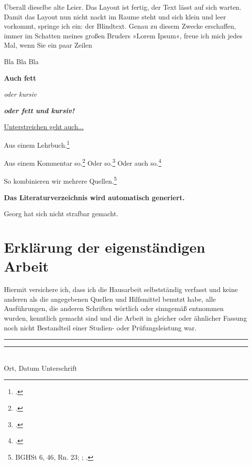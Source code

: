 \documentclass{jura}
\begin{document}
	
	
	Überall dieselbe alte Leier. Das Layout ist fertig, der Text lässt auf sich warten. Damit das Layout nun nicht nackt im Raume steht und sich klein und leer vorkommt, springe ich ein: der Blindtext. Genau zu diesem Zwecke erschaffen, immer im Schatten meines großen Bruders »Lorem Ipsum«, freue ich mich jedes Mal, wenn Sie ein paar Zeilen 
	
	
	
	Bla Bla Bla
	
	\textbf{Auch fett}
	
	\textit{oder kursiv}
	
	\textit{\textbf{oder fett und kursiv!}}
	
	\underline{Unterstreichen geht auch...}
	
	\levelup
	
	\levelup
	
	\levelup
	\levelup
	
	Aus einem Lehrbuch.\footcite[\S~14~Rn.~6]{rengier}
	
	Aus einem Kommentar so.\footcite[Sternberg-Lieben/Schuster][\S~15~Rn.~68]{schoenkeschroeder} Oder so.\footcite[Freund][]{mueko} Oder auch so.\footcite[Bosch][]{schoenkeschroeder}
	
	So kombinieren wir mehrere Quellen.\footnote{BGHSt 6, 46, Rn. 23; \cite[Heuchemer][\S~13~Rn.~91]{beckOKStGB}; \cite[236]{esser}.}
	
	\textbf{Das Literaturverzeichnis wird automatisch generiert.}
	
	\levelup
	
	Georg hat sich nicht strafbar gemacht.
	
	\newpage
	
	\section*{Erklärung der eigenständigen Arbeit}
	
	Hiermit versichere ich, dass ich die Hausarbeit selbstständig verfasst und keine anderen als die angegebenen Quellen und Hilfsmittel benutzt habe, alle Ausführungen, die anderen Schriften wörtlich oder sinngemäß entnommen wurden, kenntlich gemacht sind und die Arbeit in gleicher oder ähnlicher Fassung noch nicht Bestandteil einer Studien- oder Prüfungsleistung war.
	
	\vspace{1.5cm}
	\rule{4cm}{0.1pt} \hfill \rule{7cm}{0.1pt} \\
	\hspace*{0.2cm} Ort, Datum \hspace*{2.4cm} Unterschrift
	
\end{document}
